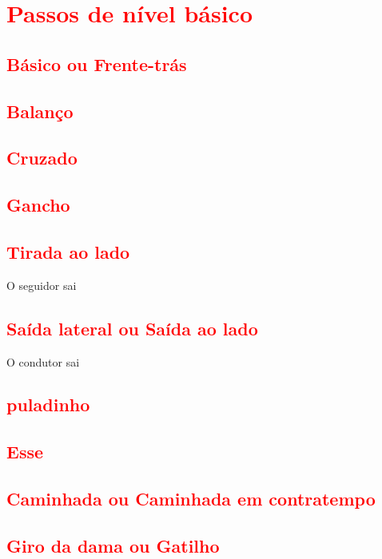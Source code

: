 

\chapter{\textcolor{red}{Passos de nível básico}}


\section{\textcolor{red}{Básico ou Frente-trás}}

\section{\textcolor{red}{Balanço}}

\section{\textcolor{red}{Cruzado}}

\section{\textcolor{red}{Gancho}}

\section{\textcolor{red}{Tirada ao lado}}
O seguidor sai

\section{\textcolor{red}{Saída lateral ou Saída ao lado}}
O condutor sai

\section{\textcolor{red}{puladinho}}

\section{\textcolor{red}{Esse}}

\section{\textcolor{red}{Caminhada ou Caminhada em contratempo}}

\section{\textcolor{red}{Giro da dama ou Gatilho}}


